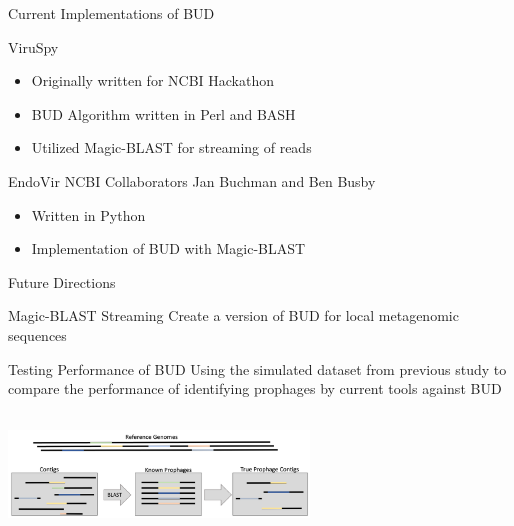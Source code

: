 \documentclass[11pt]{beamer}
\begin{document}
	\begin{frame}{Current Implementations of BUD}
	\begin{block}{ViruSpy}
	\begin{itemize}
	\item Originally written for NCBI Hackathon
	\item BUD Algorithm written in Perl and BASH
	\item Utilized Magic-BLAST for streaming of reads 
	\end{itemize}
	\end{block}
	
	\begin{block}{EndoVir}
	NCBI Collaborators Jan Buchman and Ben Busby \\ 
	\begin{itemize}
	\item Written in Python
	\item Implementation of BUD with Magic-BLAST
	\end{itemize}
	\end{block}
	\end{frame}
	
	\begin{frame}{Future Directions}
	\begin{block}{Magic-BLAST Streaming}
	Create a version of BUD for local metagenomic sequences 
	\end{block}
	
	\begin{block}{Testing Performance of BUD}
	Using the simulated dataset from previous study to compare the performance of identifying prophages by current tools against BUD
	\center
	\includegraphics[height=4cm, width=8cm]{fig.png}
	
	\end{block}
	\end{frame}
	
	
	
\section{}
\end{document}
